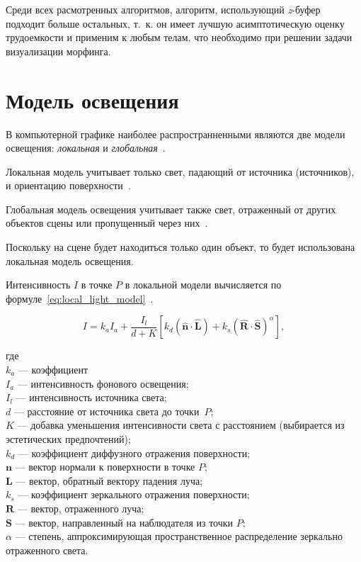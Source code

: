 	Среди всех расмотренных алгоритмов, алгоритм, использующий \textit{z}-буфер подходит больше остальных, т.~к. он имеет лучшую асимптотическую оценку трудоемкости и применим к любым телам, что необходимо при решении задачи визуализации морфинга.
    
    \section{Модель освещения}
    
    В компьютерной графике наиболее распространненными являются две модели освещения: \textit{локальная} и \textit{глобальная}~\cite{rogers}.
    
    Локальная модель учитывает только свет, падающий от источника (источников), и ориентацию поверхности~\cite{rogers}.
    
    Глобальная модель освещения учитывает также свет, отраженный от других объектов сцены или пропущенный через них~\cite{rogers}.
    
    Поскольку на сцене будет находиться только один объект, то будет использована локальная модель освещения.
    
    Интенсивность $I$ в точке $P$ в локальной модели вычисляется по формуле~\eqref{eq:local_light_model}~\cite{rogers}.
    
    \begin{equation}
    	\label{eq:local_light_model}
    	I = k_aI_a + \frac{I_l}{d + K}[k_d(\mathbf{\hat{n}\cdot \hat{L}})+k_s(\mathbf{\hat{R}\cdot \hat{S}})^\alpha],
    \end{equation}
    
    где \\
    $k_a$ --- коэффициент \\
    $I_a$ --- интенсивность фонового освещения; \\
    $I_l$ --- интенсивность источника света; \\
    $d$ --- расстояние от источника света до точки~$P$; \\
    $K$ --- добавка уменьшения интенсивности света с расстоянием (выбирается из эстетических предпочтений); \\
    $k_d$ --- коэффициент диффузного отражения поверхности; \\
    $\mathbf{n}$ --- вектор нормали к поверхности в точке $P$; \\
    $\mathbf{L}$ --- вектор, обратный вектору падения луча; \\
    $k_s$ --- коэффициент зеркального отражения поверхности; \\
    $\mathbf{R}$ --- вектор, отраженного луча; \\
    $\mathbf{S}$ --- вектор, направленный на наблюдателя из точки $P$; \\
    $\alpha$ --- степень, аппроксимирующая пространственное распределение зеркально отраженного света.
        
